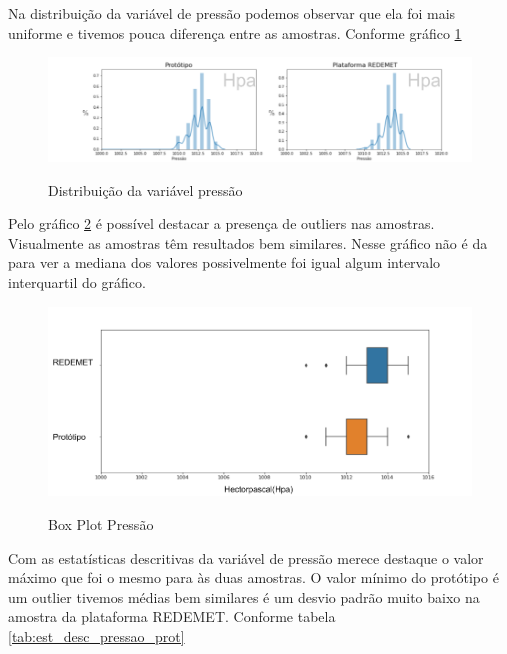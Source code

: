 Na distribuição da variável de pressão podemos observar que ela foi mais uniforme e tivemos pouca diferença entre as amostras. Conforme gráfico \ref{fig:dist_pressao}

\begin{figure} [!h]
    \centering
    \caption{Distribuição da variável pressão}    
    \includegraphics [scale = 0.5] {Figuras/dist_pressao.png}
    \label{fig:dist_pressao}
\end{figure}

Pelo gráfico \ref{fig:box_plot_pressao} é possível destacar a presença de outliers nas amostras. Visualmente as amostras têm resultados bem similares. Nesse gráfico não é da para ver a mediana dos valores possivelmente foi igual algum intervalo interquartil do gráfico.

\begin{figure} [!h]
    \centering
    \caption{Box Plot Pressão}    
    \includegraphics [scale = 0.45] {Figuras/box_plot_pressao.png}
    \label{fig:box_plot_pressao}
\end{figure}

Com as estatísticas descritivas da variável de pressão merece destaque o valor máximo que foi o mesmo para às duas amostras. O valor mínimo do protótipo é um outlier tivemos médias bem similares é um desvio padrão muito baixo na amostra da plataforma REDEMET. Conforme tabela \ref{tab:est_desc_pressao_prot}

